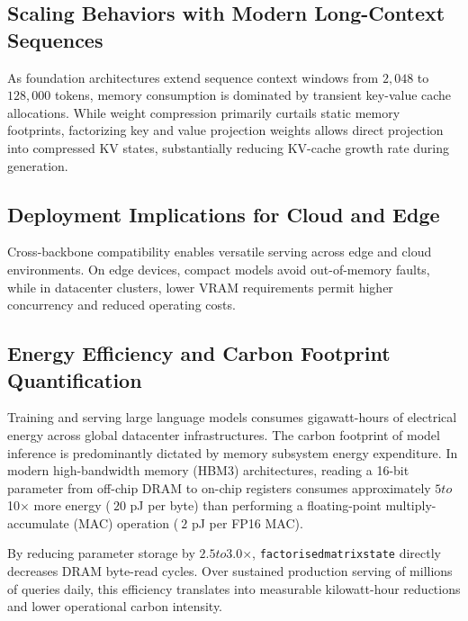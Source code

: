 \subsection{Scaling Behaviors with Modern Long-Context Sequences}
As foundation architectures extend sequence context windows from $2{,}048$ to $128{,}000$ tokens, memory consumption is dominated by transient key-value cache allocations. While weight compression primarily curtails static memory footprints, factorizing key and value projection weights allows direct projection into compressed KV states, substantially reducing KV-cache growth rate during generation.

\subsection{Deployment Implications for Cloud and Edge}
Cross-backbone compatibility enables versatile serving across edge and cloud environments. On edge devices, compact models avoid out-of-memory faults, while in datacenter clusters, lower VRAM requirements permit higher concurrency and reduced operating costs.

\subsection{Energy Efficiency and Carbon Footprint Quantification}
Training and serving large language models consumes gigawatt-hours of electrical energy across global datacenter infrastructures. The carbon footprint of model inference is predominantly dictated by memory subsystem energy expenditure. In modern high-bandwidth memory (HBM3) architectures, reading a 16-bit parameter from off-chip DRAM to on-chip registers consumes approximately $5$\times$ to $10$\times$ more energy ($~20$ pJ per byte) than performing a floating-point multiply-accumulate (MAC) operation ($~2$ pJ per FP16 MAC).

By reducing parameter storage by $2.5$\times$ to $3.0$\times$, \texttt{factorisedmatrixstate} directly decreases DRAM byte-read cycles. Over sustained production serving of millions of queries daily, this efficiency translates into measurable kilowatt-hour reductions and lower operational carbon intensity.
